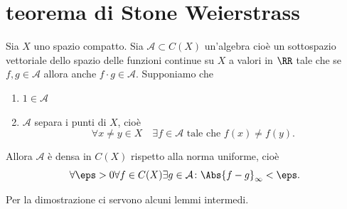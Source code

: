 \section{teorema di Stone Weierstrass}

\begin{theorem}
Sia $X$ uno spazio compatto.
Sia ${\mathcal A} \subset C(X)$ un'algebra 
cioè un sottospazio vettoriale dello spazio delle funzioni continue 
su $X$ a valori in $\RR$
tale che se $f,g\in {\mathcal A}$ allora anche $f\cdot g\in {\mathcal A}$.
Supponiamo che
\begin{enumerate}
\item $1 \in {\mathcal A}$
\item ${\mathcal A}$ separa i punti di $X$, cioè
\[
\forall x \neq y \in X \quad \exists f \in {\mathcal A} \text{ tale che } f(x)\neq f(y).
\]
\end{enumerate}

Allora ${\mathcal A}$ è densa in $C(X)$ rispetto alla norma uniforme,
cioè 
\[
\forall \eps>0 \forall f\in C(X)\exists g\in {\mathcal A}\colon \Abs{f-g}_\infty < \eps.
\]
\end{theorem}

Per la dimostrazione ci servono alcuni lemmi intermedi.

